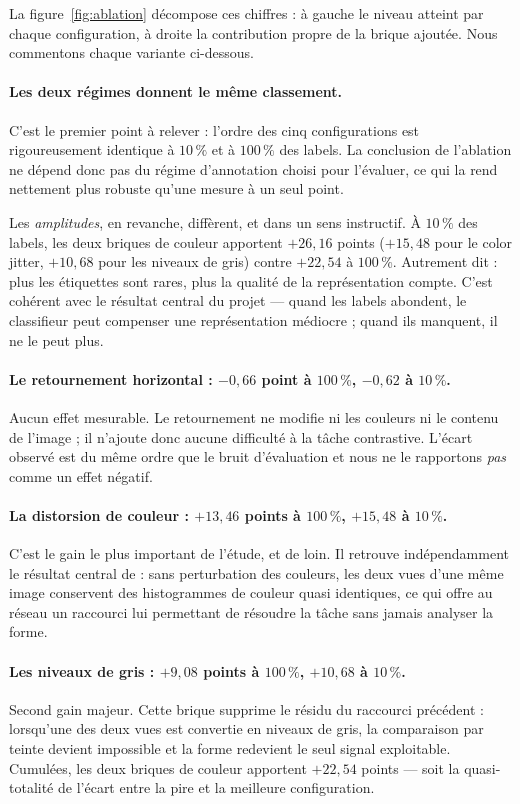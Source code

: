 \documentclass[11pt,a4paper]{article}
\begin{document}
La figure~\ref{fig:ablation} décompose ces chiffres : à gauche le niveau atteint par chaque
configuration, à droite la contribution propre de la brique ajoutée. Nous commentons chaque
variante ci-dessous.

\paragraph{Les deux régimes donnent le même classement.} C'est le premier point à relever :
l'ordre des cinq configurations est rigoureusement identique à $10\,\%$ et à $100\,\%$ des
labels. La conclusion de l'ablation ne dépend donc pas du régime d'annotation choisi pour
l'évaluer, ce qui la rend nettement plus robuste qu'une mesure à un seul point.

Les \emph{amplitudes}, en revanche, diffèrent, et dans un sens instructif. À $10\,\%$ des
labels, les deux briques de couleur apportent $+26{,}16$ points ($+15{,}48$ pour le color
jitter, $+10{,}68$ pour les niveaux de gris) contre $+22{,}54$ à $100\,\%$. Autrement dit :
plus les étiquettes sont rares, plus la qualité de la représentation compte. C'est cohérent
avec le résultat central du projet --- quand les labels abondent, le classifieur peut
compenser une représentation médiocre ; quand ils manquent, il ne le peut plus.

\paragraph{Le retournement horizontal : $-0{,}66$ point à $100\,\%$, $-0{,}62$ à $10\,\%$.}
Aucun effet mesurable. Le
retournement ne modifie ni les couleurs ni le contenu de l'image ; il n'ajoute donc aucune
difficulté à la tâche contrastive. L'écart observé est du même ordre que le bruit
d'évaluation et nous ne le rapportons \emph{pas} comme un effet négatif.

\paragraph{La distorsion de couleur : $+13{,}46$ points à $100\,\%$, $+15{,}48$ à $10\,\%$.}
C'est le gain le plus important de l'étude, et de loin. Il retrouve indépendamment le résultat central de
\cite{chen2020simclr} : sans perturbation des couleurs, les deux vues d'une même image
conservent des histogrammes de couleur quasi identiques, ce qui offre au réseau un raccourci
lui permettant de résoudre la tâche sans jamais analyser la forme.

\paragraph{Les niveaux de gris : $+9{,}08$ points à $100\,\%$, $+10{,}68$ à $10\,\%$.}
Second gain majeur. Cette brique
supprime le résidu du raccourci précédent : lorsqu'une des deux vues est convertie en
niveaux de gris, la comparaison par teinte devient impossible et la forme redevient le seul
signal exploitable. Cumulées, les deux briques de couleur apportent $+22{,}54$ points ---
soit la quasi-totalité de l'écart entre la pire et la meilleure configuration.
\end{document}
